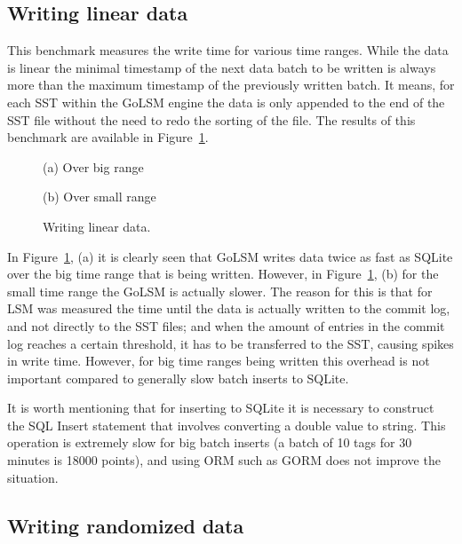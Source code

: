 \subsection{Writing linear data}

This benchmark measures the write time for various time ranges. While the data is linear the minimal timestamp of the next data batch to be written is always more than the maximum timestamp of the previously written batch. It means, for each SST within the GoLSM engine the data is only appended to the end of the SST file without the need to redo the sorting of the file. The results of this benchmark are available in Figure~\ref{fig6}.

\begin{figure}[!htb]
   \begin{minipage}{0.48\textwidth}
    \centering
    \resizebox{\textwidth}{!}{%
        
    }
    \label{figure}{(a) Over big range}
   \end{minipage}\hfill
   \begin{minipage}{0.48\textwidth}
    \centering
    \resizebox{\textwidth}{!}{%
        
    }
    \label{figure}{(b) Over small range}
   \end{minipage}
   
    \caption{Writing linear data.}\label{fig6}
\end{figure}

In Figure~\ref{fig6}, (a) it is clearly seen that GoLSM writes data twice as fast as SQLite over the big time range that is being written.  However, in Figure~\ref{fig6}, (b) for the small time range the GoLSM is actually slower. The reason for this is that for LSM was measured the time until the data is actually written to the commit log, and not directly to the SST files; and when the amount of entries in the commit log reaches a certain threshold, it has to be transferred to the SST, causing spikes in write time. However, for big time ranges being written this overhead is not important compared to generally slow batch inserts to SQLite. 

It is worth mentioning that for inserting to SQLite it is necessary to construct the SQL Insert statement that involves converting a double value to string. This operation is extremely slow for big batch inserts (a batch of 10 tags for 30 minutes is 18000 points), and using ORM such as GORM does not improve the situation.

\subsection{Writing randomized data}

